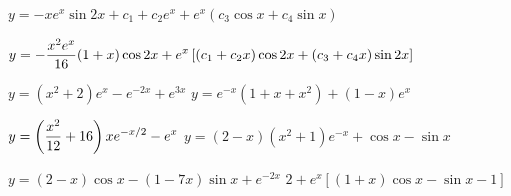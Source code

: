  $y=-xe^{x}\sin2x+c_{1}+c_{2}e^{x}
+e^{x}(c_{3}\cos x+c_{4}\sin x)$

 $y=-\displaystyle\frac{x^{2}e^{x}}{16}(1+x)\cos2x
+e^{x}\left[(c_{1}+c_{2}x)\cos2x+(c_{3}+c_{4}x)\sin2x\right]$

 $y=(x^{2}+2)e^{x}-e^{-2x}+e^{3x}$
 $y=e^{-x}(1+x+x^{2})+(1-x)e^{x}$

 $y=\displaystyle\left(\frac{x^{2}}{12}+16\right)xe^{-x/2}
-e^{x}$
 $y=(2-x)(x^{2}+1)e^{-x}+\cos x-\sin x$

 $y=(2-x)\cos x-(1-7x)\sin x+e^{-2x}$
 $2+e^{x}\left[(1+x)\cos x-\sin x-1\right]$

